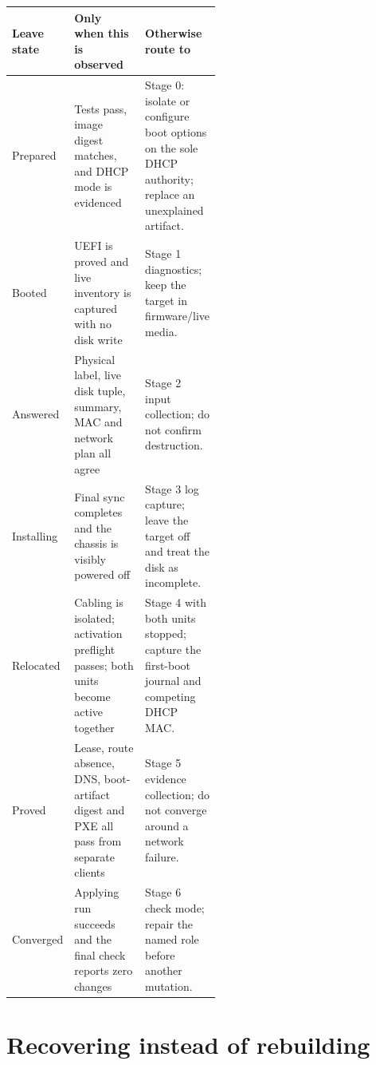 \begin{tabularx}{\linewidth}{@{}p{0.17\linewidth}p{0.35\linewidth}L@{}}
\toprule
\textbf{Leave state} & \textbf{Only when this is observed} &
\textbf{Otherwise route to}\\
\midrule
Prepared & Tests pass, image digest matches, and DHCP mode is evidenced &
Stage 0: isolate or configure boot options on the sole DHCP authority; replace
an unexplained artifact.\\
Booted & UEFI is proved and live inventory is captured with no disk write &
Stage 1 diagnostics; keep the target in firmware/live media.\\
Answered & Physical label, live disk tuple, summary, MAC and network plan all
agree & Stage 2 input collection; do not confirm destruction.\\
Installing & Final sync completes and the chassis is visibly powered off &
Stage 3 log capture; leave the target off and treat the disk as incomplete.\\
Relocated & Cabling is isolated; activation preflight passes; both units become
active together & Stage 4 with both units stopped; capture the first-boot
journal and competing DHCP MAC.\\
Proved & Lease, route absence, DNS, boot-artifact digest and PXE all pass from
separate clients & Stage 5 evidence collection; do not converge around a
network failure.\\
Converged & Applying run succeeds and the final check reports zero changes &
Stage 6 check mode; repair the named role before another mutation.\\
\bottomrule
\end{tabularx}

\section{Recovering instead of rebuilding}
\begin{telosfacts}[0.24]
\end{telosfacts}

